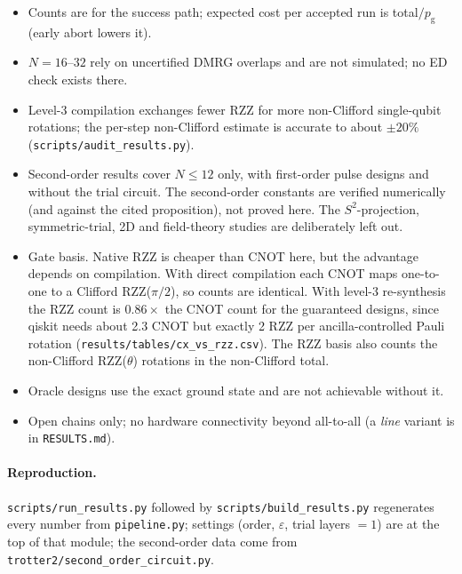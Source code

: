 \documentclass[11pt]{article}
\newcommand{\eps}{\varepsilon}
\newcommand{\pg}{p_{\mathrm g}}
\begin{document}
\begin{itemize}
\item Counts are for the success path; expected cost per accepted run is total$/\pg$ (early abort lowers it).
\item $N=16$--$32$ rely on uncertified DMRG overlaps and are not simulated; no ED check exists there.
\item Level-3 compilation exchanges fewer RZZ for more non-Clifford single-qubit rotations; the per-step non-Clifford
 estimate is accurate to about $\pm20\%$ (\texttt{scripts/audit\_results.py}).
\item Second-order results cover $N\le12$ only, with first-order pulse designs and without the trial circuit. The
 second-order constants are verified numerically (and against the cited proposition), not proved here. The
 $S^2$-projection, symmetric-trial, 2D and field-theory studies are deliberately left out.
\item Gate basis. Native RZZ is cheaper than CNOT here, but the advantage depends on compilation. With direct
 compilation each CNOT maps one-to-one to a Clifford RZZ($\pi/2$), so counts are identical. With level-3
 re-synthesis the RZZ count is $0.86\times$ the CNOT count for the guaranteed designs, since qiskit needs about 2.3 CNOT
 but exactly 2 RZZ per ancilla-controlled Pauli rotation (\texttt{results/tables/cx\_vs\_rzz.csv}). The RZZ basis also
 counts the non-Clifford RZZ($\theta$) rotations in the non-Clifford total.
\item Oracle designs use the exact ground state and are not achievable without it.
\item Open chains only; no hardware connectivity beyond all-to-all (a \emph{line} variant is in \texttt{RESULTS.md}).
\end{itemize}

\paragraph{Reproduction.} \texttt{scripts/run\_results.py} followed by \texttt{scripts/build\_results.py} regenerates
every number from \texttt{pipeline.py}; settings (order, $\eps$, trial layers $=1$) are at the top of that module; the second-order data come from \texttt{trotter2/second\_order\_circuit.py}.
\end{document}
